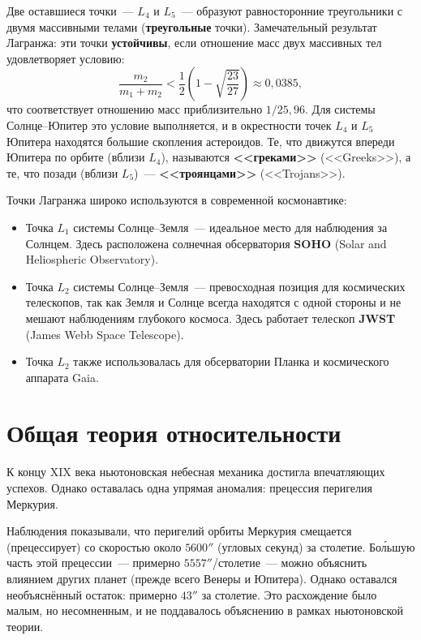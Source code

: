 \documentclass[12pt,a4paper]{article}
\begin{document}
Две оставшиеся точки~--- $L_4$ и $L_5$~--- образуют равносторонние
треугольники с двумя массивными телами (\textbf{треугольные} точки).
Замечательный результат Лагранжа: эти точки \textbf{устойчивы}, если
отношение масс двух массивных тел удовлетворяет условию:
\begin{equation}
  \frac{m_2}{m_1 + m_2} < \frac{1}{2}\left(1 - \sqrt{\frac{23}{27}}\right)
  \approx 0{,}0385,
\end{equation}
что соответствует отношению масс приблизительно $1/25{,}96$. Для системы
Солнце--Юпитер это условие выполняется, и в окрестности точек $L_4$ и $L_5$
Юпитера находятся большие скопления астероидов. Те, что движутся впереди
Юпитера по орбите (вблизи $L_4$), называются \textbf{<<греками>>}
(<<Greeks>>), а те, что позади (вблизи $L_5$)~--- \textbf{<<троянцами>>}
(<<Trojans>>).

Точки Лагранжа широко используются в современной космонавтике:
\begin{itemize}
  \item Точка $L_1$ системы Солнце--Земля~--- идеальное место для
    наблюдения за Солнцем. Здесь расположена солнечная обсерватория
    \textbf{SOHO} (Solar and Heliospheric Observatory).
  \item Точка $L_2$ системы Солнце--Земля~--- превосходная позиция для
    космических телескопов, так как Земля и Солнце всегда находятся с одной
    стороны и не мешают наблюдениям глубокого космоса. Здесь работает
    телескоп \textbf{JWST} (James Webb Space Telescope).
  \item Точка $L_2$ также использовалась для обсерватории Планка и
    космического аппарата Gaia.
\end{itemize}

\section{Общая теория относительности}

К концу XIX века ньютоновская небесная механика достигла впечатляющих
успехов. Однако оставалась одна упрямая аномалия: прецессия перигелия
Меркурия.

Наблюдения показывали, что перигелий орбиты Меркурия смещается
(прецессирует) со скоростью около $5600''$ (угловых секунд) за столетие.
Бо\'{л}ьшую часть этой прецессии~--- примерно $5557''$/столетие~--- можно
объяснить влиянием других планет (прежде всего Венеры и Юпитера). Однако
оставался необъяснённый остаток: примерно $43''$ за столетие. Это
расхождение было малым, но несомненным, и не поддавалось объяснению в
рамках ньютоновской теории.
\end{document}
